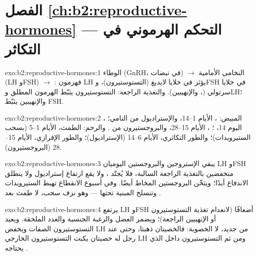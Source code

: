 \section*{الفصل \ref{ch:b2:reproductive-hormones} --- التحكم الهرموني في التكاثر}

\begin{solution}{exo:b2:reproductive-hormones:1}
الوطاء (GnRH، في نبضات) $\to$ النخامى الأمامية
(LH وFSH) $\to$
: فهرمون LH يؤثر في خلايا لايديغ (التستوستيرون)، وFSH في خلايا سرتولي
(، والإنهيبين). والتغذية الراجعة: التستوستيرون يثبّط
الهرمون المطلق وLH؛ والإنهيبين يثبّط FSH.
\end{solution}

\begin{solution}{exo:b2:reproductive-hormones:2}
المبيض: ، الأيام 1--14، والإستراديول من 
النامي؛ ، اليوم 14، ؛ ، الأيام 15--28،
والبروجستيرون من . والرحم: الطمث، الأيام 1--5
(بسحب الستيرويدات)؛ والطور التكاثري، الأيام 6--14 (الإستراديول)؛
والطور الإفرازي، الأيام 15--28 (البروجستيرون).
\end{solution}

\begin{solution}{exo:b2:reproductive-hormones:3}
يبقي الإستروجين والبروجستين اليوميان LH وFSH منخفضين بالتغذية
الراجعة السالبة، فلا يُجنّد ، ولا يقع ارتفاع إستراديول ولا
ينطلق الاندفاع أبدًا؛ ويثخّن البروجستين المخاط أيضًا. وفي
أسبوع الانقطاع تهبط الستيرويدات وتنسلخ  المبنية
تحتها --- وهو نزف سحب، لا طمث بعد
.
\end{solution}

\begin{solution}{exo:b2:reproductive-hormones:4}
يرتفع LH وFSH أضعافًا (لانعدام تغذية التستوستيرون أو الإنهيبين الراجعة)؛
ويضمر العضل والرغبة الجنسية والغدد الملحقة. ويعيد التستوستيرون
الصفات ويخفض LH من جديد، لا الخصوبة: فالخصيتان
ذهبتا، وحتى عند رجل له خصيتان يكبت التستوستيرون
الخارجي LH ومن ثم التستوستيرون داخل 
الذي يحتاجه .
\end{solution}

